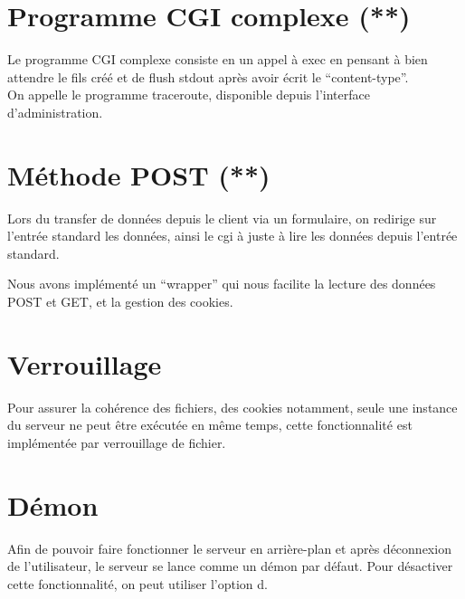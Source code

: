 \documentclass{article}
\begin{document}
\section{Programme CGI complexe (**)}

Le programme CGI complexe consiste en un appel à exec en pensant à bien attendre le fils créé et de flush stdout après avoir écrit le ``content-type''.\\

On appelle le programme traceroute, disponible depuis l'interface d'administration.

\section{Méthode POST (**)}

Lors du transfer de données depuis le client via un formulaire, on redirige sur l'entrée standard les données, ainsi le cgi à juste à lire les données depuis l'entrée standard.

Nous avons implémenté un ``wrapper'' qui nous facilite la lecture des données POST et GET, et la gestion des cookies.

\section{Verrouillage}

Pour assurer la cohérence des fichiers, des cookies notamment, seule une instance du serveur ne peut être exécutée
en même temps, cette fonctionnalité est implémentée par verrouillage de fichier.

\section{Démon}

Afin de pouvoir faire fonctionner le serveur en arrière-plan et après déconnexion de l'utilisateur, le serveur se lance
comme un démon par défaut. Pour désactiver cette fonctionnalité, on peut utiliser l'option d.
\end{document}
